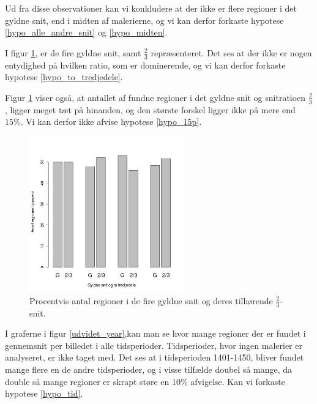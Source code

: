 {Ud fra disse observationer kan vi konkludere at der ikke er flere
regioner i det gyldne snit, end i midten af malerierne, og vi kan derfor
forkaste hypotese \ref{hypo_alle_andre_snit} og \ref{hypo_midten}.

I figur \ref{G_vs_to_trejedele_udvidet}, er de fire gyldne snit, samt
$\frac{2}{3}$ repræsenteret. Det ses at der ikke er nogen entydighed på
hvilken ratio, som er dominerende, og vi kan derfor forkaste hypotese
\ref{hypo_to_tredjedele}.

Figur \ref{G_vs_to_trejedele_udvidet} viser også, at antallet af fundne
regioner i det gyldne snit og
snitratioen $\frac{2}{3}$, ligger meget tæt på hinanden, og den største
forskel ligger ikke på mere end $15\%$. Vi kan derfor ikke afvise
hypotese \ref{hypo_15p}.

\begin{figure}[h!]
	\begin{center}
		\includegraphics[width=0.6\textwidth]{afsnit/resultater/billeder/G_vs_to_tredjedeleU.png}
	\end{center}
	\caption{Procentvis antal regioner i de fire gyldne snit og deres
    tilhørende $\frac{2}{3}$-snit.}
	\label{G_vs_to_trejedele_udvidet}
\end{figure}

I graferne i figur \ref{udvidet_year},kan man se hvor mange regioner der
er fundet i gennemsnit per billedet i alle tidsperioder. Tidsperioder,
hvor ingen malerier er analyseret, er ikke taget med. Det ses at i
tidsperioden 1401-1450, bliver fundet mange flere en de andre
tidsperioder, og i visse tilfælde doubel så mange, da double så mange
regioner er skrapt støre en $10\%$ afvigelse. Kan vi forkaste hypotese
\ref{hypo_tid}.

}
